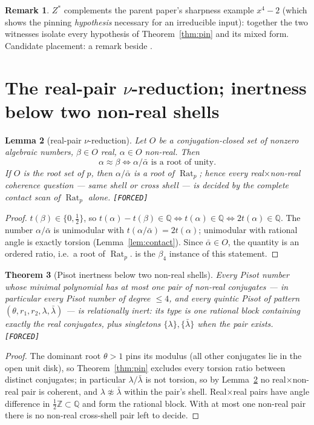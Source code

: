 \documentclass[11pt]{article}
\newcommand{\F}{\textnormal{\texttt{[FORCED]}}}
\newcommand{\Q}{\mathbb{Q}}
\newcommand{\Z}{\mathbb{Z}}
\newcommand{\Rat}{\operatorname{Rat}}
\newtheorem{theorem}{Theorem}[section]
\newtheorem{lemma}[theorem]{Lemma}
\theoremstyle{definition}
\newtheorem{remark}[theorem]{Remark}
\begin{document}
\begin{remark}
$Z^{*}$ complements the parent paper's sharpness example $x^4-2$ (which shows
the pinning \emph{hypothesis} necessary for an irreducible input): together the
two witnesses isolate every hypothesis of Theorem~\ref{thm:pin} and its mixed
form. Candidate placement: a remark beside \cite[Ex.~7.19]{relcharge}.
\end{remark}

\section{The real-pair $\nu$-reduction; inertness below two non-real shells}
\label{sec:reduction}

\begin{lemma}[real-pair $\nu$-reduction]\label{lem:redu}
Let $O$ be a conjugation-closed set of nonzero algebraic numbers, $\beta\in O$
real, $\alpha\in O$ non-real. Then
\[
\alpha\approx\beta \iff \alpha/\bar\alpha \text{ is a root of unity.}
\]
If $O$ is the root set of $p$, then $\alpha/\bar\alpha$ is a \emph{root of
$\Rat_p$}; hence every real$\times$non-real coherence question --- same shell or
cross shell --- is decided by the complete contact scan of $\Rat_p$ alone. \F
\end{lemma}

\begin{proof}
$t(\beta)\in\{0,\tfrac12\}$, so $t(\alpha)-t(\beta)\in\Q\iff t(\alpha)\in\Q
\iff 2t(\alpha)\in\Q$. The number $\alpha/\bar\alpha$ is unimodular with
$t(\alpha/\bar\alpha)=2t(\alpha)$; unimodular with rational angle is exactly
torsion (Lemma~\ref{lem:contact}). Since $\bar\alpha\in O$, the quantity is an
ordered ratio, i.e.\ a root of $\Rat_p$. \cite[Ex.~7.17(iii)]{relcharge} is the
$\beta_4$ instance of this statement.
\end{proof}

\begin{theorem}[Pisot inertness below two non-real shells]\label{thm:pisot1pair}
Every Pisot number whose minimal polynomial has at most one pair of non-real
conjugates --- in particular every Pisot number of degree $\le 4$, and every
quintic Pisot of pattern $(\theta,r_1,r_2,\lambda,\bar\lambda)$ --- is
relationally inert: its type is one rational block containing exactly the real
conjugates, plus singletons $\{\lambda\},\{\bar\lambda\}$ when the pair exists. \F
\end{theorem}

\begin{proof}
The dominant root $\theta>1$ pins its modulus (all other conjugates lie in the
open unit disk), so Theorem~\ref{thm:pin} excludes every torsion ratio between
distinct conjugates; in particular $\lambda/\bar\lambda$ is not torsion, so by
Lemma~\ref{lem:redu} no real$\times$non-real pair is coherent, and
$\lambda\not\approx\bar\lambda$ within the pair's shell. Real$\times$real pairs
have angle difference in $\tfrac12\Z\subset\Q$ and form the rational block.
With at most one non-real pair there is no non-real cross-shell pair left to
decide.
\end{proof}
\end{document}
